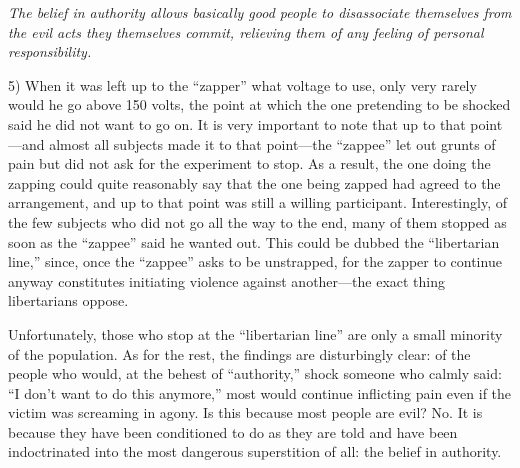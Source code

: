 \documentclass{book}
\begin{document}
\emph{The belief in authority allows basically good people to disassociate themselves from the evil acts they themselves commit, relieving them of any feeling of personal responsibility.}

5) When it was left up to the \enquote{zapper} what voltage to use, only very rarely would he go above 150 volts, the point at which the one pretending to be shocked said he did not want to go on. It is very important to note that up to that point---and almost all subjects made it to that point---the \enquote{zappee} let out grunts of pain but did not ask for the experiment to stop. As a result, the one doing the zapping could quite reasonably say that the one being zapped had agreed to the arrangement, and up to that point was still a willing participant. Interestingly, of the few subjects who did not go all the way to the end, many of them stopped as soon as the \enquote{zappee} said he wanted out. This could be dubbed the \enquote{libertarian line,} since, once the \enquote{zappee} asks to be unstrapped, for the zapper to continue anyway constitutes initiating violence against another---the exact thing libertarians oppose.

Unfortunately, those who stop at the \enquote{libertarian line} are only a small minority of the population. As for the rest, the findings are disturbingly clear: of the people who would, at the behest of \enquote{authority,} shock someone who calmly said: \enquote{I don't want to do this anymore,} most would continue inflicting pain even if the victim was screaming in agony. Is this because most people are evil? No. It is because they have been conditioned to do as they are told and have been indoctrinated into the most dangerous superstition of all: the belief in authority.
\end{document}
